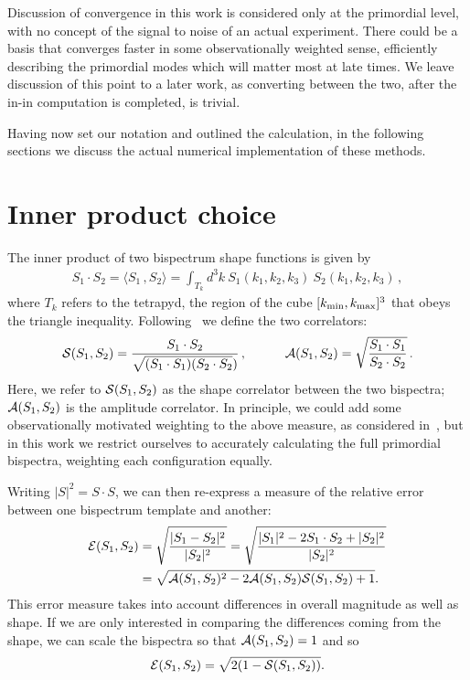 Discussion of convergence in this work is considered only at the primordial level,
with no concept of the signal to noise of an actual experiment.
There could be a basis that converges faster in some observationally weighted sense,
efficiently describing the primordial modes which will matter most at late times.
We leave discussion of this point to a later work, as converting between the two,
after the in-in computation is completed, is trivial.


Having now set our notation and outlined the calculation, in the following sections we
discuss the actual numerical implementation of these methods.
\section{Inner product choice}\label{sec:inner_product}
The inner product of two bispectrum shape functions is given by 
\begin{align}
    S_1\cdot S_2  = \langle S_1\,, S_2 \rangle = \int_{T_k} d^3k \: S_1(k_1,k_2,k_3) \: S_2(k_1,k_2,k_3)\,,\label{inner_prod}
\end{align}
where $T_k$ refers to the tetrapyd, the region of the cube $[{k_\text{min}},{k_\text{max}}]^3$ that obeys the triangle inequality.
Following~\cite{hung_1902}
we define the two correlators:
\begin{align}
    \mathcal{S}(S_1,S_2) = \frac{S_1\cdot S_2}{\sqrt{(S_1\cdot S_1)(S_2\cdot S_2})}\,, \qquad\quad 
\mathcal{A}(S_1,S_2) = \sqrt{\frac{S_1\cdot S_1}{S_2\cdot S_2}}\,.
\end{align}
Here, we refer to $\mathcal{S}(S_1,S_2)$ as the shape correlator between the two bispectra;
$\mathcal{A}(S_1,S_2)$ is the amplitude correlator.
In principle, we could add some observationally motivated weighting
to the above measure, as considered in~\cite{FergShell_1,FergShell_2,FergShell_3},
but in this work we restrict ourselves to accurately calculating the
full primordial bispectra, weighting each configuration equally.

Writing $|S|^2=S\cdot S$,
we can then re-express a measure of the relative error
between one bispectrum template and another:
\begin{align}\label{relative_difference}
\mathcal{E}(S_1,S_2) &= \sqrt{\frac{|S_1-S_2|^2}{|S_2|^2}}  = \sqrt{\frac{|S_1|^2-2S_1\cdot S_2+|S_2|^2}{|S_2|^2}}\nonumber\\
	   &= \sqrt{\mathcal{A}(S_1,S_2)^2-2\mathcal{A}(S_1,S_2)\mathcal{S}(S_1,S_2)+1}.
\end{align}
This error measure takes into account differences in overall magnitude as well as shape.
If we are only interested in comparing the differences coming from the shape,
we can scale the bispectra so that $\mathcal{A}(S_1,S_2)=1$ and so
\begin{align}\label{relative_difference_scaled}
    \mathcal{E}(S_1,S_2) = \sqrt{2(1-\mathcal{S}(S_1,S_2))}.
\end{align}

